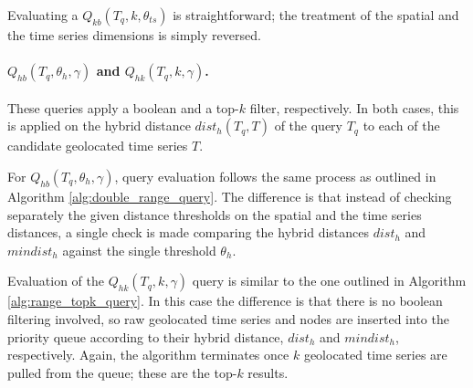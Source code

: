 Evaluating a $Q_{kb}(T_q, k, \theta_{ts})$ is straightforward; the treatment of the spatial and the time series dimensions is simply reversed.

\begin{algorithm}[!t]
\begin{small}
	\DontPrintSemicolon
	\BlankLine
	\caption{$Q_{bk}(T_q, \theta_{sp}, k)$}
	\label{alg:range_topk_query}	
\end{small}	
\end{algorithm}

\paragraph{$Q_{hb}(T_q, \theta_h, \gamma)$ and $Q_{hk}(T_q, k, \gamma)$.} These queries apply a boolean and a top-$k$ filter, respectively. In both cases, this is applied on the hybrid distance $dist_h(T_q, T)$ of the query $T_q$ to each of the candidate geolocated time series $T$.

For $Q_{hb}(T_q, \theta_h, \gamma)$, query evaluation follows the same process as outlined in Algorithm \ref{alg:double_range_query}. The difference is that instead of checking separately the given distance thresholds on the spatial and the time series distances, a single check is made comparing the hybrid distances $dist_h$ and $mindist_h$ against the single threshold $\theta_h$.

Evaluation of the $Q_{hk}(T_q, k, \gamma)$ query is similar to the one outlined in Algorithm \ref{alg:range_topk_query}. In this case the difference is that there is no boolean filtering involved, so raw geolocated time series and nodes are inserted into the priority queue according to their hybrid distance, $dist_h$ and $mindist_h$, respectively. Again, the algorithm terminates once $k$ geolocated time series are pulled from the queue; these are the top-$k$ results.

